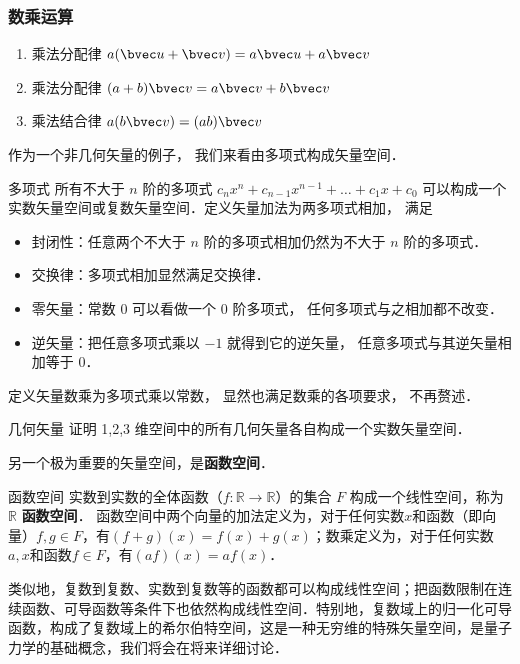 \subsubsection{数乘运算}
\begin{enumerate}
\item 乘法分配律 $a(\bvec u + \bvec v) = a\bvec u + a\bvec v$ 
\item 乘法分配律 $(a + b)\bvec v = a\bvec v + b\bvec v$
\item 乘法结合律 $a (b \bvec v) = (ab) \bvec v$
\end{enumerate}

作为一个非几何矢量的例子， 我们来看由多项式构成矢量空间．

\begin{example}{多项式}\label{LSpace_ex1}
所有不大于 $n$ 阶的多项式 $c_n x^n + c_{n-1} x^{n-1} + \dots + c_1 x + c_0$ 可以构成一个实数矢量空间或复数矢量空间．定义矢量加法为两多项式相加， 满足
\begin{itemize}
\item 封闭性：任意两个不大于 $n$ 阶的多项式相加仍然为不大于 $n$ 阶的多项式．
\item 交换律：多项式相加显然满足交换律．
\item 零矢量：常数 0 可以看做一个 0 阶多项式， 任何多项式与之相加都不改变．
\item 逆矢量：把任意多项式乘以 $-1$ 就得到它的逆矢量， 任意多项式与其逆矢量相加等于 0．
\end{itemize}
定义矢量数乘为多项式乘以常数， 显然也满足数乘的各项要求， 不再赘述．
\end{example}

\begin{exercise}{几何矢量}
证明 1,2,3 维空间中的所有几何矢量各自构成一个实数矢量空间．
\end{exercise}

另一个极为重要的矢量空间，是\textbf{函数空间}．

\begin{example}{函数空间}
实数到实数的全体函数（$f:\mathbb R \to \mathbb R$）的集合 $F$ 构成一个线性空间，称为 $\mathbb{R}$ \textbf{函数空间}． 函数空间中两个向量的加法定义为，对于任何实数$x$和函数（即向量）$f, g\in F$，有$(f+g)(x)=f(x)+g(x)$；数乘定义为，对于任何实数$a, x$和函数$f\in F$，有$(af)(x)=af(x)$．

类似地，复数到复数、实数到复数等的函数都可以构成线性空间；把函数限制在连续函数、可导函数等条件下也依然构成线性空间．特别地，复数域上的归一化可导函数，构成了复数域上的希尔伯特空间，这是一种无穷维的特殊矢量空间，是量子力学的基础概念，我们将会在将来详细讨论．
\end{example}

